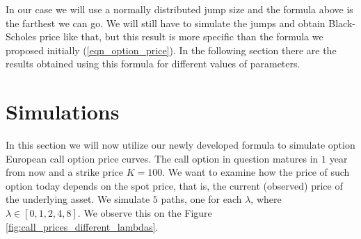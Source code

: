\documentclass[times, utf8, diplomski]{fer}
\begin{document}
\noindent In our case we will use a normally distributed jump size and the formula above is the farthest we can go. We will still have to simulate the jumps and obtain Black-Scholes price like that, but this result is more specific than the formula we proposed initially (\ref{eqn_option_price}). In the following section there are the results obtained using this formula for different values of parameters.


\section{Simulations}


In this section we will now utilize our newly developed formula to simulate option European call option price curves. The call option in question matures in $1$ year from now and a strike price $K=100$. We want to examine how the price of such option today depends on the spot price, that is, the current (observed) price of the underlying asset. We simulate $5$ paths, one for each $\lambda$, where $\lambda \in [0,1,2,4,8]$. We observe this on the Figure \ref{fig:call_prices_different_lambdas}.
\end{document}
